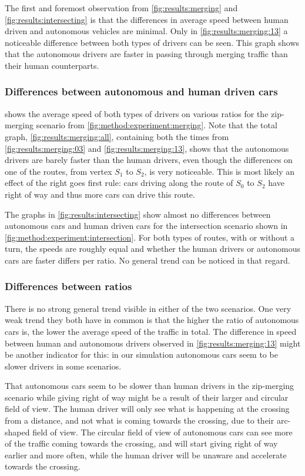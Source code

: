 The first and foremost observation from \cref{fig:results:merging} and \ref{fig:results:intersecting} is that the differences in average speed between human driven and autonomous vehicles are minimal. Only in \cref{fig:results:merging:13} a noticeable difference between both types of drivers can be seen. This graph shows that the autonomous drivers are faster in passing through merging traffic than their human counterparts.

\subsubsection{Differences between autonomous and human driven cars}
 shows the average speed of both types of drivers on various ratios for the zip-merging scenario from \cref{fig:method:experiment:merging}. Note that the total graph, \cref{fig:results:merging:all}, containing both the times from \cref{fig:results:merging:03} and \ref{fig:results:merging:13}, shows that the autonomous drivers are barely faster than the human drivers, even though the differences on one of the routes, from vertex $S_1$ to $S_2$, is very noticeable. This is most likely an effect of the right goes first rule: cars driving along the route of $S_0$ to $S_2$ have right of way and thus more cars can drive this route.

The graphs in \cref{fig:results:intersecting} show almost no differences between autonomous cars and human driven cars for the intersection scenario shown in \cref{fig:method:experiment:intersection}. For both types of routes, with or without a turn, the speeds are roughly equal and whether the human drivers or autonomous cars are faster differs per ratio. No general trend can be noticed in that regard.

\subsubsection{Differences between ratios}
There is no strong general trend visible in either of the two scenarios. One very weak trend they both have in common is that the higher the ratio of autonomous cars is, the lower the average speed of the traffic in total. The difference in speed between human and autonomous drivers observed in \cref{fig:results:merging:13} might be another indicator for this: in our simulation autonomous cars seem to be slower drivers in some scenarios.

That autonomous cars seem to be slower than human drivers in the zip-merging scenario while giving right of way might be a result of their larger and circular field of view. The human driver will only see what is happening at the crossing from a distance, and not what is coming towards the crossing, due to their arc-shaped field of view. The circular field of view of autonomous cars can see more of the traffic coming towards the crossing, and will start giving right of way earlier and more often, while the human driver will be unaware and accelerate towards the crossing.
